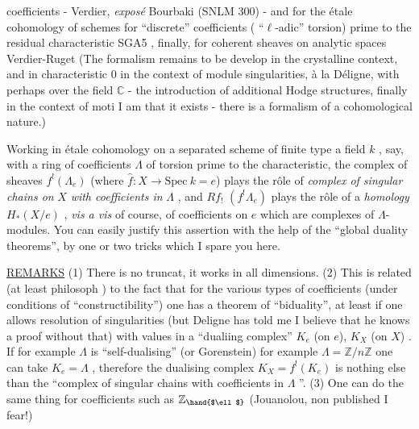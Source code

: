 
coefficients - Verdier, \emph{exposé} Bourbaki (SNLM 300) - and for the étale
cohomology of schemes for ``discrete'' coefficients ( ``$\ell$-adic''  torsion)
prime to the residual characteristic\over{-}{(} SGA5 \over{-}{)}, finally, for coherent sheaves
on analytic spaces \over{-}{(} Verdier-Ruget\over{-}{)} (The formalism remains to be develop
in the crystalline context, and in characteristic $0$ in the context of
 module   singularities, à la Déligne, with perhaps \deleted{-}
\hand{-} over the field $\mathbb{C}$ - the introduction of additional Hodge structures, finally
in the context of moti I am   that it exists  
-   there is a formalism of a cohomological
nature.)

Working in étale cohomology on a separated scheme of finite type  a
field $k$ , say, with a ring of coefficients $\Lambda$ of torsion prime to the
characteristic, the complex of sheaves $f^{!}(\Lambda_e)$ (where $\hat{f} : X \to \mathrm{Spec}\ k = e$)
plays the rôle of \emph{complex of singular chains on} $X$ \emph{with coefficients in} $\Lambda$ ,
and $Rf_{!}$ $(f^{!}\Lambda_e)$ plays the rôle of a \emph{homology} $H_{*}(X/e)$ , \emph{vis a vis} of course,
of coefficients on $e$ which are complexes of $\Lambda$-modules. You can easily
justify this assertion with the help of the ``global duality theorems'', by
one or two tricks which I spare you here.

\uline{REMARKS} (1) There is no  truncat, it works in all dimensions.
(2) This is related (at least   philosoph  ) to the
fact that for the various types of coefficients (under conditions of
``constructibility'') one has a theorem of ``biduality'', at least if one allows
resolution of singularities (but Deligne has told me I believe that he knows
a proof without that)\hand{,} with values in a ``dualiing complex'' $K_e$ (on $e$),
$K_X$ (on $X$) . If for example $\Lambda$ is ``self-dualising'' (or Gorenstein) for
example $\Lambda = \mathbb{Z}/n\mathbb{Z}$\hand{,} one can take $K_e = \Lambda$ , therefore the dualising complex
$K_X = f^{!}(K_e)$ is nothing else than the ``complex of singular chains with
coefficients in $\Lambda$ ''.
(3) One can do the same thing for coefficients such as $\mathbb{Z}_{\hand{$\ell$}}$ (Jouanolou, 
non published \hand{,} I fear!)

